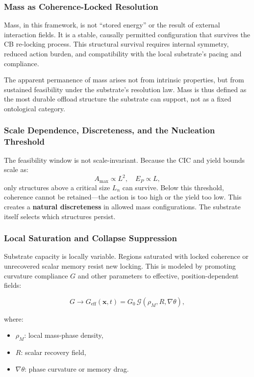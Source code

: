 \documentclass[preprints,article,submit,pdftex,moreauthors]{Definitions/mdpi}
\begin{document}
\subsubsection*{Mass as Coherence-Locked Resolution}

Mass, in this framework, is not “stored energy” or the result of external interaction fields. It is a stable, causally permitted configuration that survives the CB re-locking process. This structural survival requires internal symmetry, reduced action burden, and compatibility with the local substrate’s pacing and compliance.

The apparent permanence of mass arises not from intrinsic properties, but from sustained feasibility under the substrate's resolution law. Mass is thus defined as the most durable offload structure the substrate can support, not as a fixed ontological category.

\subsubsection*{Scale Dependence, Discreteness, and the Nucleation Threshold}

The feasibility window is not scale-invariant. Because the CIC and yield bounds scale as:
\[
A_{\max} \propto L^2, \quad E_P \propto L,
\]
only structures above a critical size \( L_n \) can survive. Below this threshold, coherence cannot be retained—the action is too high or the yield too low. This creates a \textbf{natural discreteness} in allowed mass configurations. The substrate itself selects which structures persist.

\subsubsection*{Local Saturation and Collapse Suppression}

Substrate capacity is locally variable. Regions saturated with locked coherence or unrecovered scalar memory resist new locking. This is modeled by promoting curvature compliance \( G \) and other parameters to effective, position-dependent fields:

\[
G \rightarrow G_{\mathrm{eff}}(\mathbf{x},t) = G_0\,\mathcal{G}(\rho_M, R, \nabla\theta),
\]

where:
\begin{itemize}
    \item \( \rho_M \): local mass-phase density,
    \item \( R \): scalar recovery field,
    \item \( \nabla\theta \): phase curvature or memory drag.
\end{itemize}
\end{document}
